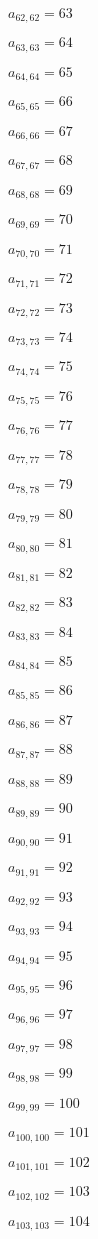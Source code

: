 \documentclass[a4paper,12pt]{article}
\begin{document}
$a _{ 62, 62 } = 63$

$a _{ 63, 63 } = 64$

$a _{ 64, 64 } = 65$

$a _{ 65, 65 } = 66$

$a _{ 66, 66 } = 67$

$a _{ 67, 67 } = 68$

$a _{ 68, 68 } = 69$

$a _{ 69, 69 } = 70$

$a _{ 70, 70 } = 71$

$a _{ 71, 71 } = 72$

$a _{ 72, 72 } = 73$

$a _{ 73, 73 } = 74$

$a _{ 74, 74 } = 75$

$a _{ 75, 75 } = 76$

$a _{ 76, 76 } = 77$

$a _{ 77, 77 } = 78$

$a _{ 78, 78 } = 79$

$a _{ 79, 79 } = 80$

$a _{ 80, 80 } = 81$

$a _{ 81, 81 } = 82$

$a _{ 82, 82 } = 83$

$a _{ 83, 83 } = 84$

$a _{ 84, 84 } = 85$

$a _{ 85, 85 } = 86$

$a _{ 86, 86 } = 87$

$a _{ 87, 87 } = 88$

$a _{ 88, 88 } = 89$

$a _{ 89, 89 } = 90$

$a _{ 90, 90 } = 91$

$a _{ 91, 91 } = 92$

$a _{ 92, 92 } = 93$

$a _{ 93, 93 } = 94$

$a _{ 94, 94 } = 95$

$a _{ 95, 95 } = 96$

$a _{ 96, 96 } = 97$

$a _{ 97, 97 } = 98$

$a _{ 98, 98 } = 99$

$a _{ 99, 99 } = 100$

$a _{ 100, 100 } = 101$

$a _{ 101, 101 } = 102$

$a _{ 102, 102 } = 103$

$a _{ 103, 103 } = 104$
\end{document}
